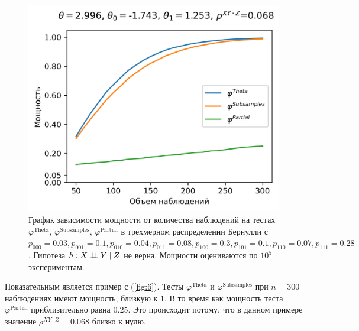 \begin{figure}[H]
    \centering
    \includegraphics[scale=0.6]{images/graph6.png}
    \caption{График зависимости мощности от количества наблюдений
    на тестах $\varphi^{\text{Theta}}$, $\varphi^{\text{Subsamples}}$, $\varphi^{\text{Partial}}$
    в трехмерном распределении Бернулли с $p_{000}=0.03, p_{001}=0.1, 
    p_{010}=0.04, p_{011}=0.08,
    p_{100}=0.3, p_{101}=0.1, p_{110}=0.07, p_{111}=0.28$. 
    Гипотеза $h: X \perp\!\!\!\perp Y \mid Z$ не верна.
    Мощности оцениваются по $10^5$ экспериментам.} \label{fig:6}
\end{figure}

Показательным является пример с (\autoref{fig:6}). Тесты 
$\varphi^{\text{Theta}}$ и $\varphi^{\text{Subsamples}}$ при $n=300$
наблюдениях имеют мощность, близкую к $1$. В то время как мощность
теста $\varphi^{\text{Partial}}$ приблизительно равна $0.25$. Это происходит потому, что
в данном примере значение $\rho^{XY\cdot Z}=0.068$ близко к нулю.

